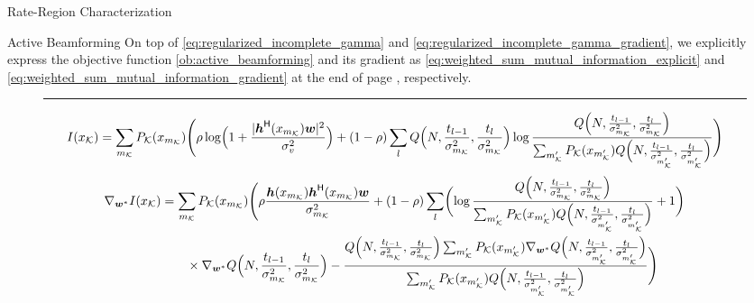 \documentclass[journal]{IEEEtran}
\begin{document}
\begin{section}{Rate-Region Characterization}
\begin{subsection}{Active Beamforming}
		On top of \eqref{eq:regularized_incomplete_gamma} and \eqref{eq:regularized_incomplete_gamma_gradient}, we explicitly express the objective function \eqref{ob:active_beamforming} and its gradient as \eqref{eq:weighted_sum_mutual_information_explicit} and \eqref{eq:weighted_sum_mutual_information_gradient} at the end of page \pageref{eq:weighted_sum_mutual_information_explicit}, respectively.
		\begin{figure*}[!b]
			\hrule
			\begin{equation}
				I(x_{\mathcal{K}})=\sum_{m_{\mathcal{K}}}P_{\mathcal{K}}(x_{m_{\mathcal{K}}})\Biggl(\rho\log\Bigl(1+\frac{\lvert\boldsymbol{h}^\mathsf{H}(x_{m_{\mathcal{K}}})\boldsymbol{w}\rvert^2}{\sigma_v^2}\Bigr)+(1-\rho)\sum_l Q\Bigl(N,\frac{t_{l-1}}{\sigma_{m_{\mathcal{K}}}^2},\frac{t_l}{\sigma_{m_{\mathcal{K}}}^2}\Bigr) \log \frac{Q\Bigl(N,\frac{t_{l-1}}{\sigma_{m_{\mathcal{K}}}^2},\frac{t_l}{\sigma_{m_{\mathcal{K}}}^2}\Bigr)}{\sum_{m_{\mathcal{K}}'} P_{\mathcal{K}}(x_{m_{\mathcal{K}}'}) Q\Bigl(N,\frac{t_{l-1}}{\sigma_{m_{\mathcal{K}}'}^2},\frac{t_l}{\sigma_{m_{\mathcal{K}}'}^2}\Bigr)}\Biggr)
				\label{eq:weighted_sum_mutual_information_explicit}
			\end{equation}
			\begin{align}
				\nabla_{\boldsymbol{w}^*} I(x_{\mathcal{K}})
				 & = \sum_{m_{\mathcal{K}}}P_{\mathcal{K}}(x_{m_{\mathcal{K}}})\Biggl(\rho\frac{\boldsymbol{h}(x_{m_{\mathcal{K}}})\boldsymbol{h}^\mathsf{H}(x_{m_{\mathcal{K}}})\boldsymbol{w}}{\sigma_{m_{\mathcal{K}}}^2}+(1-\rho)\sum_l\biggl(\log\frac{Q\Bigl(N,\frac{t_{l-1}}{\sigma_{m_{\mathcal{K}}}^2},\frac{t_l}{\sigma_{m_{\mathcal{K}}}^2}\Bigr)}{\sum_{m_{\mathcal{K}}'}P_{\mathcal{K}}(x_{m_{\mathcal{K}}'})Q\Bigl(N,\frac{t_{l-1}}{\sigma_{m_{\mathcal{K}}'}^2},\frac{t_l}{\sigma_{m_{\mathcal{K}}'}^2}\Bigr)}+1\biggr)\nonumber                                                                                   \\
				 & \qquad \times \nabla_{\boldsymbol{w}^*} Q\Bigl(N,\frac{t_{l-1}}{\sigma_{m_{\mathcal{K}}}^2},\frac{t_l}{\sigma_{m_{\mathcal{K}}}^2}\Bigr)-\frac{Q\Bigl(N,\frac{t_{l-1}}{\sigma_{m_{\mathcal{K}}}^2},\frac{t_l}{\sigma_{m_{\mathcal{K}}}^2}\Bigr)\sum_{m_{\mathcal{K}}'}P_{\mathcal{K}}(x_{m_{\mathcal{K}}'})\nabla_{\boldsymbol{w}^*}Q\Bigl(N,\frac{t_{l-1}}{\sigma_{m_{\mathcal{K}}'}^2},\frac{t_l}{\sigma_{m_{\mathcal{K}}'}^2}\Bigr)}{\sum_{m_{\mathcal{K}}'}P_{\mathcal{K}}(x_{m_{\mathcal{K}}'})Q\Bigl(N,\frac{t_{l-1}}{\sigma_{m_{\mathcal{K}}'}^2},\frac{t_l}{\sigma_{m_{\mathcal{K}}'}^2}\Bigr)}\Biggr)
				\label{eq:weighted_sum_mutual_information_gradient}

\end{align}
\end{figure*}
\end{subsection}
\end{section}
\end{document}
